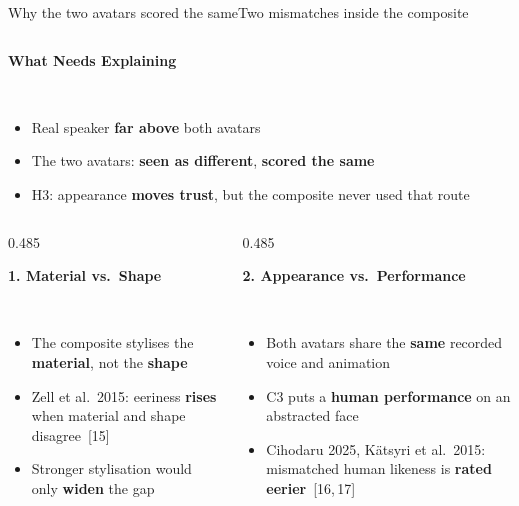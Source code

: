 \documentclass[aspectratio=169,10pt]{beamer}
\newcommand{\hl}[1]{{\color{knblue}\textbf{#1}}}
\newcommand{\good}[1]{{\color{kngreen}\textbf{#1}}}
\newcommand{\bad}[1]{{\color{knred}\textbf{#1}}}
\newcommand{\panelhead}[1]{\noindent\colorbox{kncyan}{\parbox{0.96\textwidth}{\centering\vspace{1pt}\color{white}\scriptsize\bfseries #1\vspace{1pt}}}\\[0.25em]}
\newcommand{\panel}[1]{\noindent\colorbox{knlight}{\parbox{0.96\textwidth}{\vspace{2pt}\scriptsize
\begin{itemize}\setlength{\itemsep}{0.2em}\setlength{\leftmargini}{1.1em}#1\end{itemize}\vspace{2pt}}}}
\begin{document}

\begin{frame}{Why the two avatars scored the same}{Two mismatches inside the composite}
  \vspace{0.3em}
  \begin{columns}[T,onlytextwidth]
    \begin{column}{\textwidth}
      \panelhead{What Needs Explaining}
      \panel{%
        \item Real speaker \bad{far above} both avatars
        \item The two avatars: \hl{seen as different}, \hl{scored the same}
        \item H3: appearance \good{moves trust}, but the composite never used that route}
    \end{column}
  \end{columns}
  \par\vspace*{1.6em}
  \begin{columns}[T,onlytextwidth]
    \begin{column}{0.485\textwidth}
      \panelhead{1. Material vs.\ Shape}
      \panel{%
        \item The composite stylises the \hl{material}, not the \hl{shape}
        \item Zell et al.\ 2015: eeriness \bad{rises} when material and shape disagree~[15]
        \item Stronger stylisation would only \bad{widen} the gap}
    \end{column}
    \begin{column}{0.485\textwidth}
      \panelhead{2. Appearance vs.\ Performance}
      \panel{%
        \item Both avatars share the \hl{same} recorded voice and animation
        \item C3 puts a \hl{human performance} on an abstracted face
        \item Cihodaru 2025, K\"atsyri et al.\ 2015: mismatched human likeness is \bad{rated eerier}~[16,\,17]}
    \end{column}
  \end{columns}
\end{frame}
\end{document}
